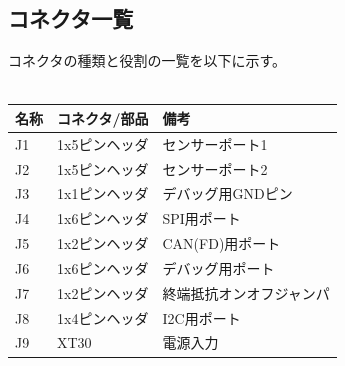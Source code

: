 \documentclass[autodetect-engine,11pt,a4paper,ja=standard]{bxjsarticle}
\begin{document}
\subsection{コネクタ一覧}
コネクタの種類と役割の一覧を以下に示す。\\
\\
\begin{tabularx}{\linewidth}{| @{}l| l| X@{}|}
\hline
名称 & コネクタ/部品 & 備考 \\
\hline
J1 & 1x5ピンヘッダ & センサーポート1 \\
J2 & 1x5ピンヘッダ & センサーポート2 \\
J3 & 1x1ピンヘッダ & デバッグ用GNDピン \\
J4 & 1x6ピンヘッダ & SPI用ポート \\
J5 & 1x2ピンヘッダ & CAN(FD)用ポート \\
J6 & 1x6ピンヘッダ & デバッグ用ポート \\
J7 & 1x2ピンヘッダ & 終端抵抗オンオフジャンパ \\
J8 & 1x4ピンヘッダ & I2C用ポート \\
J9 & XT30 & 電源入力 \\

\hline
\end{tabularx}
\end{document}
